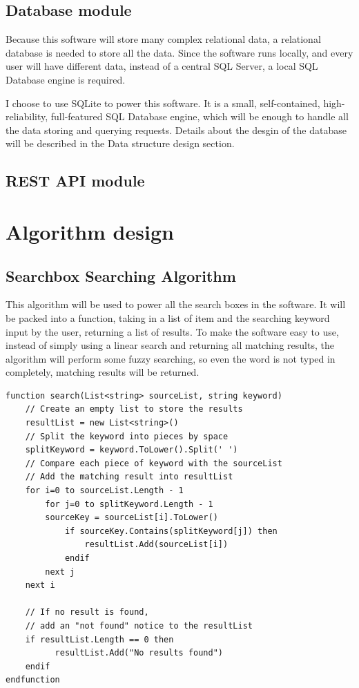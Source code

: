 \documentclass[a4paper]{report}
\begin{document}
\subsection{Database module}

Because this software will store many complex relational data, a relational database is needed to store all the data. Since the software runs locally, and every user will have different data, instead of a central SQL Server, a local SQL Database engine is required.

I choose to use SQLite to power this software. It is a small, self-contained, high-reliability, full-featured SQL Database engine, which will be enough to handle all the data storing and querying requests. Details about the desgin of the database will be described in the Data structure design section.

\subsection{REST API module}

\section{Algorithm design}

\subsection{Searchbox Searching Algorithm}

This algorithm will be used to power all the search boxes in the software. It will be packed into a function, taking in a list of item and the searching keyword input by the user, returning a list of results. To make the software easy to use, instead of simply using a linear search and returning all matching results, the algorithm will perform some fuzzy searching, so even the word is not typed in completely, matching results will be returned.

\begin{verbatim}
function search(List<string> sourceList, string keyword)
    // Create an empty list to store the results
    resultList = new List<string>()
    // Split the keyword into pieces by space
    splitKeyword = keyword.ToLower().Split(' ')
    // Compare each piece of keyword with the sourceList
    // Add the matching result into resultList
    for i=0 to sourceList.Length - 1
        for j=0 to splitKeyword.Length - 1
        sourceKey = sourceList[i].ToLower()
            if sourceKey.Contains(splitKeyword[j]) then
                resultList.Add(sourceList[i])
            endif
        next j
    next i

    // If no result is found,
    // add an "not found" notice to the resultList
    if resultList.Length == 0 then
          resultList.Add("No results found")
    endif
endfunction
\end{verbatim}
\end{document}

